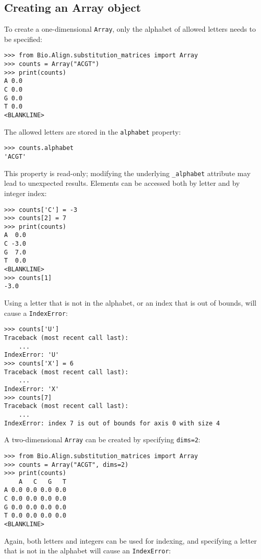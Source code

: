 \subsection*{Creating an Array object}

To create a one-dimensional \verb+Array+, only the alphabet of allowed letters needs to be specified:

\begin{verbatim}
>>> from Bio.Align.substitution_matrices import Array
>>> counts = Array("ACGT")
>>> print(counts)
A 0.0
C 0.0
G 0.0
T 0.0
<BLANKLINE>
\end{verbatim}
The allowed letters are stored in the \verb+alphabet+ property:

\begin{verbatim}
>>> counts.alphabet
'ACGT'
\end{verbatim}
This property is read-only; modifying the underlying \verb+_alphabet+ attribute may lead to unexpected results.
Elements can be accessed both by letter and by integer index:

\begin{verbatim}
>>> counts['C'] = -3
>>> counts[2] = 7
>>> print(counts)
A  0.0
C -3.0
G  7.0
T  0.0
<BLANKLINE>
>>> counts[1]
-3.0
\end{verbatim}

Using a letter that is not in the alphabet, or an index that is out of bounds, will cause a \verb+IndexError+:

\begin{verbatim}
>>> counts['U']
Traceback (most recent call last):
    ...
IndexError: 'U'
>>> counts['X'] = 6
Traceback (most recent call last):
    ...
IndexError: 'X'
>>> counts[7]
Traceback (most recent call last):
    ...
IndexError: index 7 is out of bounds for axis 0 with size 4
\end{verbatim}

A two-dimensional \verb+Array+ can be created by specifying \verb+dims=2+:

\begin{verbatim}
>>> from Bio.Align.substitution_matrices import Array
>>> counts = Array("ACGT", dims=2)
>>> print(counts)
    A   C   G   T
A 0.0 0.0 0.0 0.0
C 0.0 0.0 0.0 0.0
G 0.0 0.0 0.0 0.0
T 0.0 0.0 0.0 0.0
<BLANKLINE>
\end{verbatim}
Again, both letters and integers can be used for indexing, and specifying a letter that is not in the alphabet will cause an \verb+IndexError+:

